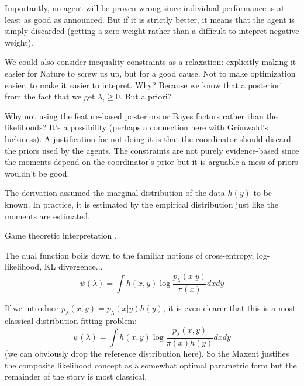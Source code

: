 \documentclass[english]{scrartcl}
\begin{document}
Importantly, no agent will be proven wrong since individual performance is at least as good as announced. But if it is strictly better, it means that the agent is simply discarded (getting a zero weight rather than a difficult-to-intepret negative weight).  

We could also consider inequality constraints as a relaxation: explicitly making it easier for Nature to screw us up, but for a good cause. Not to make optimization easier, to make it easier to intepret. Why? Because we know that a posteriori from the fact that we get $\lambda_i\geq 0$. But a priori?



Why not using the feature-based posteriors or Bayes factors rather than the likelihoods? It's a possibility (perhaps a connection here with Gr\"unwald's luckiness). A justification for not doing it is that the coordinator should discard the priors used by the agents. The constraints are not purely evidence-based since the moments depend on the coordinator's prior but it is arguable a mess of priors wouldn't be good.

The derivation assumed the marginal distribution of the data $h(y)$ to be known. In practice, it is estimated by the empirical distribution just like the moments are estimated.

Game theoretic interpretation \cite{Grunwald-04}.

The dual function boils down to the familiar notions of cross-entropy, log-likelihood, KL divergence...
$$
\psi(\lambda)
= \int h(x,y) \log \frac{p_\lambda(x|y)}{\pi(x)} dx dy
$$

If we introduce $p_\lambda(x,y)=p_\lambda(x|y)h(y)$, it is even clearer that this is a most classical distribution fitting problem:
$$
\psi(\lambda)
= \int h(x,y) \log \frac{p_\lambda(x,y)}{\pi(x)h(y)} dx dy
$$
(we can obviously drop the reference distribution here). So the Maxent justifies the composite likelihood concept as a somewhat optimal parametric form but the remainder of the story is most classical.
\end{document}
